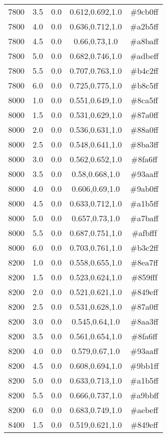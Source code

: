 \begin{tabular}{ccccc}
7800 & 3.5 & 0.0 & 0.612,0.692,1.0 & \#9cb0ff \\ 
7800 & 4.0 & 0.0 & 0.636,0.712,1.0 & \#a2b5ff \\ 
7800 & 4.5 & 0.0 & 0.66,0.73,1.0 & \#a8baff \\ 
7800 & 5.0 & 0.0 & 0.682,0.746,1.0 & \#adbeff \\ 
7800 & 5.5 & 0.0 & 0.707,0.763,1.0 & \#b4c2ff \\ 
7800 & 6.0 & 0.0 & 0.725,0.775,1.0 & \#b8c5ff \\ 
8000 & 1.0 & 0.0 & 0.551,0.649,1.0 & \#8ca5ff \\ 
8000 & 1.5 & 0.0 & 0.531,0.629,1.0 & \#87a0ff \\ 
8000 & 2.0 & 0.0 & 0.536,0.631,1.0 & \#88a0ff \\ 
8000 & 2.5 & 0.0 & 0.548,0.641,1.0 & \#8ba3ff \\ 
8000 & 3.0 & 0.0 & 0.562,0.652,1.0 & \#8fa6ff \\ 
8000 & 3.5 & 0.0 & 0.58,0.668,1.0 & \#93aaff \\ 
8000 & 4.0 & 0.0 & 0.606,0.69,1.0 & \#9ab0ff \\ 
8000 & 4.5 & 0.0 & 0.633,0.712,1.0 & \#a1b5ff \\ 
8000 & 5.0 & 0.0 & 0.657,0.73,1.0 & \#a7baff \\ 
8000 & 5.5 & 0.0 & 0.687,0.751,1.0 & \#afbfff \\ 
8000 & 6.0 & 0.0 & 0.703,0.761,1.0 & \#b3c2ff \\ 
8200 & 1.0 & 0.0 & 0.558,0.655,1.0 & \#8ea7ff \\ 
8200 & 1.5 & 0.0 & 0.523,0.624,1.0 & \#859fff \\ 
8200 & 2.0 & 0.0 & 0.521,0.621,1.0 & \#849eff \\ 
8200 & 2.5 & 0.0 & 0.531,0.628,1.0 & \#87a0ff \\ 
8200 & 3.0 & 0.0 & 0.545,0.64,1.0 & \#8aa3ff \\ 
8200 & 3.5 & 0.0 & 0.561,0.654,1.0 & \#8fa6ff \\ 
8200 & 4.0 & 0.0 & 0.579,0.67,1.0 & \#93aaff \\ 
8200 & 4.5 & 0.0 & 0.608,0.694,1.0 & \#9bb1ff \\ 
8200 & 5.0 & 0.0 & 0.633,0.713,1.0 & \#a1b5ff \\ 
8200 & 5.5 & 0.0 & 0.666,0.737,1.0 & \#a9bbff \\ 
8200 & 6.0 & 0.0 & 0.683,0.749,1.0 & \#aebeff \\ 
8400 & 1.5 & 0.0 & 0.519,0.621,1.0 & \#849eff \\ 

\end{tabular}
